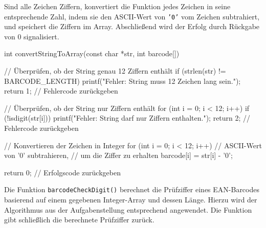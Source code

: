Sind alle Zeichen Ziffern, konvertiert die Funktion jedes Zeichen in seine
entsprechende Zahl, indem sie den ASCII-Wert von \texttt{'0'} vom Zeichen
subtrahiert, und speichert die Ziffern im Array. Abschließend wird der Erfolg
durch Rückgabe von 0 signalisiert.

\begin{codebox}[lang=c, fontsize=\small]
int convertStringToArray(const char *str, int barcode[]) {
    // Überprüfen, ob der String genau 12 Ziffern enthält
    if (strlen(str) != BARCODE_LENGTH) {
        printf("Fehler: String muss 12 Zeichen lang sein.\n");
        return 1;  // Fehlercode zurückgeben
    }

    // Überprüfen, ob der String nur Ziffern enthält
    for (int i = 0; i < 12; i++) {
        if (!isdigit(str[i])) {
            printf("Fehler: String darf nur Ziffern enthalten.\n");
            return 2;  // Fehlercode zurückgeben
        }
    }

    // Konvertieren der Zeichen in Integer
    for (int i = 0; i < 12; i++) {
        // ASCII-Wert von '0' subtrahieren,
        // um die Ziffer zu erhalten
        barcode[i] = str[i] - '0';
    }

    return 0;  // Erfolgscode zurückgeben
}
\end{codebox}

Die Funktion \texttt{barcodeCheckDigit()} berechnet die Prüfziffer eines
EAN-Barcodes basierend auf einem gegebenen Integer-Array und dessen Länge.
Hierzu wird der Algorithmus aus der Aufgabenstellung entsprechend angewendet.
Die Funktion gibt schließlich die berechnete Prüfziffer zurück.






